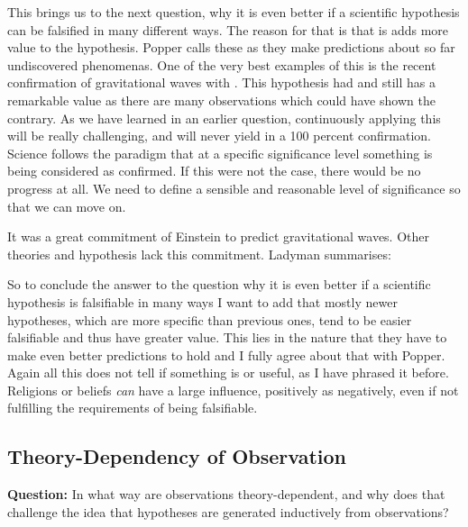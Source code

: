 \documentclass[11pt]{scrartcl}
\begin{document}
This brings us to the next question, why it is even better if a scientific hypothesis can be falsified in many different ways. The reason for that is that is adds more value to the hypothesis. Popper calls these  \cite[p. 68]{ladyman} as they make predictions about so far undiscovered phenomenas. One of the very best examples of this is the recent confirmation of gravitational waves with  \cite{ligo}. This hypothesis had and still has a remarkable value as there are many observations which could have shown the contrary. As we have learned in an earlier question, continuously applying this will be really challenging, and will never yield in a 100 percent confirmation. Science follows the paradigm that at a specific significance level something is being considered as confirmed. If this were not the case, there would be no progress at all. We need to define a sensible and reasonable level of significance so that we can move on.

It was a great commitment of Einstein to predict gravitational waves. Other theories and hypothesis lack this commitment. Ladyman summarises:  \cite[p. 71]{ladyman}

So to conclude the answer to the question why it is even better if a scientific hypothesis is falsifiable in many ways I want to add that mostly newer hypotheses, which are more specific than previous ones, tend to be easier falsifiable and thus have greater value. This lies in the nature that they have to make even better predictions to hold \cite[p. 73]{ladyman} and I fully agree about that with Popper. Again all this does not tell if something is  \cite[p. 72]{ladyman} or useful, as I have phrased it before. Religions or beliefs \textit{can} have a large influence, positively as negatively, even if not fulfilling the requirements of being falsifiable.

\subsection{Theory-Dependency of Observation}

\textbf{Question:} In what way are observations theory-dependent, and why does that challenge the idea that hypotheses are generated inductively from observations?
\end{document}
